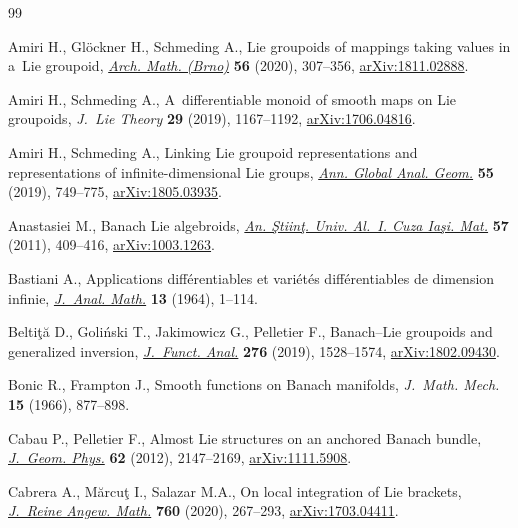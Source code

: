 \documentclass[pdftex]{sigma}
\numberwithin{equation}{section}
\begin{document}
\begin{thebibliography}{99}
\footnotesize\itemsep=0pt

Amiri H., Gl\"ockner H., Schmeding A., Lie groupoids of mappings taking values
 in a~{L}ie groupoid,
 \href{https://doi.org/10.5817/am2020-5-307}{\textit{Arch. Math. (Brno)}}
 \textbf{56} (2020), 307--356,
 \href{http://arxiv.org/abs/1811.02888}{arXiv:1811.02888}.

Amiri H., Schmeding A., A~differentiable monoid of smooth maps on {L}ie
 groupoids, \textit{J.~Lie Theory} \textbf{29} (2019), 1167--1192,
 \href{http://arxiv.org/abs/1706.04816}{arXiv:1706.04816}.

Amiri H., Schmeding A., Linking {L}ie groupoid representations and
 representations of infinite-dimensional {L}ie groups,
 \href{https://doi.org/10.1007/s10455-019-09650-3}{\textit{Ann. Global Anal.
 Geom.}} \textbf{55} (2019), 749--775,
 \href{http://arxiv.org/abs/1805.03935}{arXiv:1805.03935}.

Anastasiei M., Banach {L}ie algebroids,
 \href{https://doi.org/10.2478/v10157-011-0035-y}{\textit{An. \c{S}tiin\c{t}.
 Univ. Al.~I. Cuza Ia\c{s}i. Mat.}} \textbf{57} (2011), 409--416,
 \href{http://arxiv.org/abs/1003.1263}{arXiv:1003.1263}.

Bastiani A., Applications diff\'erentiables et vari\'et\'es diff\'erentiables
 de dimension infinie,
 \href{https://doi.org/10.1007/BF02786619}{\textit{J.~Anal. Math.}}
 \textbf{13} (1964), 1--114.

Belti\c{t}\u{a} D., Goli\'nski T., Jakimowicz G., Pelletier F., Banach--{L}ie
 groupoids and generalized inversion,
 \href{https://doi.org/10.1016/j.jfa.2018.12.002}{\textit{J.~Funct. Anal.}}
 \textbf{276} (2019), 1528--1574,
 \href{http://arxiv.org/abs/1802.09430}{arXiv:1802.09430}.

Bonic R., Frampton J., Smooth functions on {B}anach manifolds, \textit{J.~Math.
 Mech.} \textbf{15} (1966), 877--898.

Cabau P., Pelletier F., Almost {L}ie structures on an anchored {B}anach bundle,
 \href{https://doi.org/10.1016/j.geomphys.2012.06.005}{\textit{J.~Geom.
 Phys.}} \textbf{62} (2012), 2147--2169,
 \href{http://arxiv.org/abs/1111.5908}{arXiv:1111.5908}.

Cabrera A., M\u{a}rcu\c{t} I., Salazar M.A., On local integration of {L}ie
 brackets, \href{https://doi.org/10.1515/crelle-2018-0011}{\textit{J.~Reine
 Angew. Math.}} \textbf{760} (2020), 267--293,
 \href{http://arxiv.org/abs/1703.04411}{arXiv:1703.04411}.


\end{thebibliography}
\end{document}
